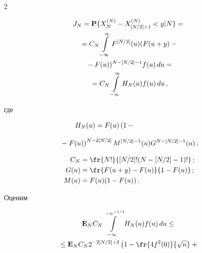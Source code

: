 \begin{multicols}{2}
\noindent


\begin{multline}


J_N={\bf P}\{X_N^{(N)}-X_{[N/2]+1}^{(N)}<y|N\}={}\\


{}=C_N\int\limits_{-\infty}^{\infty}F^{[N/2]}(u)(F(u+y)-{}\\


{}-F(u))^{N-[N/2]-1}


f(u)\,du=\\


{}=C_N\int\limits_{-\infty}^{\infty}H_N(u)f(u)\,du\,, \label{5}


\end{multline}


где


$$




H_N(u)= F(u)\left ( 1-{}\right.\hspace*{24mm} %


$$


\begin{equation}


\left. -\;F(u)\right )^{N-2[N/2]}M^{[N/2]-1}(u)G^{N-[N/2]-1}(u)\,;\!\!\!\label{6}\\


\end{equation}








\noindent


\begin{align*}


C_N&=\fr{N!}{[N/2]!(N-[N/2]-1)!}\,; \\


 G(u)&=\fr{F(u+y)-F(u)}{1-F(u)}\,; \\


M(u)&=F(u)(1-F(u))\,.


\end{align*}


 Оценим


\begin{multline}


{\bf E}_NC_N\int\limits_{-\infty}^{-n^{-1/4}}H_N(u)f(u)\,du \leq {}\\


{}\leq {\bf E}_NC_N


 2^{-2\left[N/2\right]+2}\left(1-\fr{4f^2(0)}{\sqrt{n}}+{}\right.\\



\end{multline}
\end{multicols}
